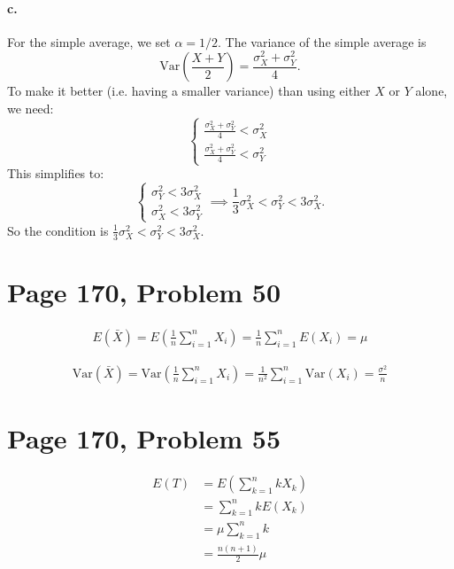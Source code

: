 \documentclass[a4paper, UTF-8]{article}
\theoremstyle{plain}
\begin{document}
\paragraph{c.}
For the simple average, we set $\alpha = 1/2$. The variance of the simple average is 
\begin{equation*}
\text{Var}\left(\frac{X+Y}{2}\right) = \frac{\sigma_X^2 + \sigma_Y^2}{4}.
\end{equation*}
To make it better (i.e. having a smaller variance) than using either $X$ or $Y$ alone, we need:
\begin{equation*}
\begin{cases}
\frac{\sigma_X^2 + \sigma_Y^2}{4} < \sigma_X^2 \\
\frac{\sigma_X^2 + \sigma_Y^2}{4} < \sigma_Y^2 
\end{cases}
\end{equation*}
This simplifies to:
\begin{equation*}
\begin{cases}
\sigma_Y^2 < 3\sigma_X^2 \\
\sigma_X^2 < 3\sigma_Y^2 
\end{cases} \implies \frac{1}{3}\sigma_X^2 < \sigma_Y^2 < 3\sigma_X^2.
\end{equation*}
So the condition is $\frac{1}{3}\sigma_X^2 < \sigma_Y^2 < 3\sigma_X^2$.

\section{Page 170, Problem 50}

\begin{align*} 
E(\bar{X}) = E\left(\frac{1}{n}\sum_{i=1}^n X_i\right) = \frac{1}{n}\sum_{i=1}^n E(X_i) = \mu
\end{align*}

\begin{align*}
\text{Var}(\bar{X}) = \text{Var}\left(\frac{1}{n}\sum_{i=1}^n X_i\right) = \frac{1}{n^2}\sum_{i=1}^n \text{Var}(X_i) = \frac{\sigma^2}{n}
\end{align*}

\section{Page 170, Problem 55}

\begin{align*}
E(T) &= E\left(\sum_{k=1}^n kX_k\right) \\ 
     &= \sum_{k=1}^n kE(X_k) \\
     &= \mu \sum_{k=1}^n k \\
     &= \frac{n(n+1)}{2}\mu
\end{align*}
\end{document}
